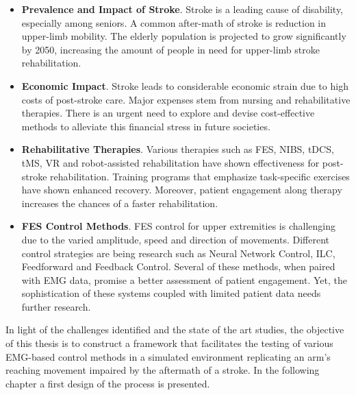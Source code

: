 \begin{itemize}
    \item \textbf{Prevalence and Impact of Stroke}. Stroke is a leading cause of disability, especially among seniors. A common after-math of stroke is reduction in upper-limb mobility. The elderly population is projected to grow significantly by 2050, increasing the amount of people in need for upper-limb stroke rehabilitation.
    \item \textbf{Economic Impact}. Stroke leads to considerable economic strain due to high costs of post-stroke care. Major expenses stem from nursing and rehabilitative therapies. There is an urgent need to explore and devise cost-effective methods to alleviate this financial stress in future societies.
    \item\textbf{Rehabilitative Therapies}. Various therapies such as FES, NIBS, tDCS, tMS, VR and robot-assisted rehabilitation have shown effectiveness for post-stroke rehabilitation. Training programs that emphasize task-specific exercises have shown enhanced recovery. Moreover, patient engagement along therapy increases the chances of a faster rehabilitation.

    \item\textbf{FES Control Methods}. FES control for upper extremities is challenging due to the varied amplitude, speed and direction of movements. Different control strategies are being research such as Neural Network Control, ILC, Feedforward and Feedback Control. Several of these methods, when paired with EMG data, promise a better assessment of patient engagement. Yet, the sophistication of these systems coupled with limited patient data needs further research.

\end{itemize}

In light of the challenges identified and the state of the art studies, the objective of this thesis is to construct a framework that facilitates the testing of various EMG-based control methods in a simulated environment replicating an arm's reaching movement impaired by the aftermath of a stroke. In the following chapter a first design of the process is presented.